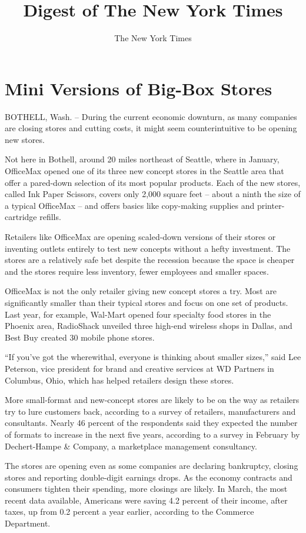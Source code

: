 \documentclass[12pt,a4paper,onecolumn]{article}
\title{Digest of The New York Times}
\author{The New York Times}
\begin{document}
\date{}
\thispagestyle{empty}
\renewcommand\contentsname{\textsf{Digest of The New York Times}}
\textsf{\tableofcontents}
\pagebreak
\setcounter{page}{1}
\section{Mini Versions of Big-Box Stores}

BOTHELL, Wash. -- During the current economic downturn, as many companies are closing stores and
cutting costs, it might seem counterintuitive to be opening new stores.

Not here in Bothell, around 20 miles northeast of Seattle, where in January, OfficeMax opened one of
its three new concept stores in the Seattle area that offer a pared-down selection of its most
popular products. Each of the new stores, called Ink Paper Scissors, covers only 2,000 square feet
-- about a ninth the size of a typical OfficeMax -- and offers basics like copy-making supplies and
printer-cartridge refills.

Retailers like OfficeMax are opening scaled-down versions of their stores or inventing outlets
entirely to test new concepts without a hefty investment. The stores are a relatively safe bet
despite the recession because the space is cheaper and the stores require less inventory, fewer
employees and smaller spaces.

OfficeMax is not the only retailer giving new concept stores a try. Most are significantly smaller
than their typical stores and focus on one set of products. Last year, for example, Wal-Mart opened
four specialty food stores in the Phoenix area, RadioShack unveiled three high-end wireless shops in
Dallas, and Best Buy created 30 mobile phone stores.

``If you've got the wherewithal, everyone is thinking about smaller sizes,'' said Lee Peterson, vice
president for brand and creative services at WD Partners in Columbus, Ohio, which has helped
retailers design these stores.

More small-format and new-concept stores are likely to be on the way as retailers try to lure
customers back, according to a survey of retailers, manufacturers and consultants. Nearly 46 percent
of the respondents said they expected the number of formats to increase in the next five years,
according to a survey in February by Dechert-Hampe \& Company, a marketplace management consultancy.

The stores are opening even as some companies are declaring bankruptcy, closing stores and reporting
double-digit earnings drops. As the economy contracts and consumers tighten their spending, more
closings are likely. In March, the most recent data available, Americans were saving 4.2 percent of
their income, after taxes, up from 0.2 percent a year earlier, according to the Commerce Department.
\end{document}
